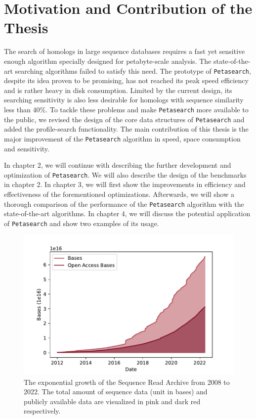 \section{Motivation and Contribution of the Thesis}

The search of homologs in large sequence databases requires a fast yet sensitive enough algorithm specially designed for petabyte-scale analysis. The state-of-the-art searching algorithms failed to satisfy this need. The prototype of \texttt{Petasearch}, despite its idea proven to be promising, has not reached its peak speed efficiency and is rather heavy in disk consumption. Limited by the current design, its searching sensitivity is also less desirable for homologs with sequence similarity less than 40\%. To tackle these problems and make \texttt{Petasearch} more available to the public, we revised the design of the core data structures of \texttt{Petasearch} and added the profile-search functionality. The main contribution of this thesis is the major improvement of the \texttt{Petasearch} algorithm in speed, space consumption and sensitivity.

In chapter 2, we will continue with describing the further development and optimization of \texttt{Petasearch}. We will also describe the design of the benchmarks in chapter 2. In chapter 3, we will first show the improvements in efficiency and effectiveness of the forementioned optimizations. Afterwards, we will show a thorough comparison of the performance of the \texttt{Petasearch} algorithm with the state-of-the-art algorithms. In chapter 4, we will discuss the potential application of \texttt{Petasearch} and show two examples of its usage.

\pagebreak

\begin{figpage}
\begin{figure}[t]
  \centering
  \includegraphics[width=\textwidth]{images/sra_stat.pdf}
  \caption{The exponential growth of the Sequence Read Archive from 2008 to 2022. The total amount of sequence data (unit in bases) and publicly available data are visualized in pink and dark red respectively.}
  \label{fig:sra_stat}
\end{figure}
\end{figpage}
